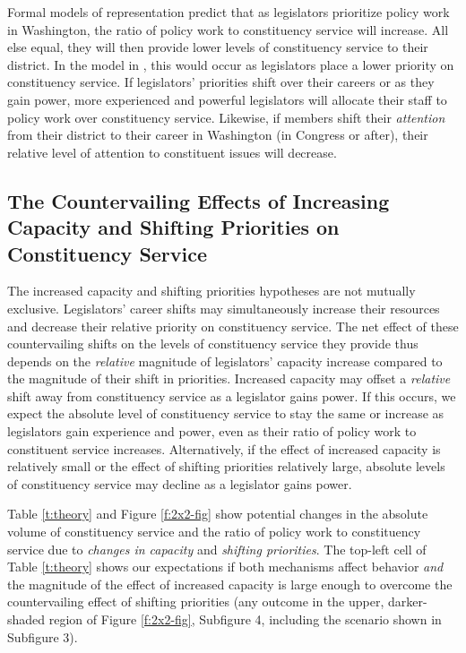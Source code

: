 \documentclass[12pt]{article}
\begin{document}
Formal models of representation predict that as legislators prioritize policy work in Washington, the ratio of policy work to constituency service will increase. All else equal, they will then provide lower levels of constituency service to their district. In the model in \cite{AshworthBuenodeMesquita2006}, this would occur as legislators place a lower priority on constituency service. If legislators' priorities shift over their careers or as they gain power, more experienced and powerful legislators will allocate their staff to policy work over constituency service. Likewise, if members shift their \textit{attention} from their district to their career in Washington (in Congress or after), their relative level of attention to constituent issues will decrease.


\subsection{The Countervailing Effects of Increasing Capacity and Shifting Priorities on Constituency Service}

The increased capacity and shifting priorities hypotheses are not mutually exclusive.
Legislators' career shifts may simultaneously increase their resources and decrease their relative priority on constituency service. The net effect of these countervailing shifts on the levels of constituency service they provide thus depends on the \textit{relative} magnitude of legislators' capacity increase compared to the magnitude of their shift in priorities. Increased capacity may offset a \textit{relative} shift away from constituency service as a legislator gains power. If this occurs, we expect the absolute level of constituency service to stay the same or increase as legislators gain experience and power, even as their ratio of policy work to constituent service increases. Alternatively, if the effect of increased capacity is relatively small or the effect of shifting priorities relatively large, absolute levels of constituency service may decline as a legislator gains power.

Table \ref{t:theory} and Figure \ref{f:2x2-fig} show potential changes in the absolute volume of constituency service and the ratio of policy work to constituency service due to \textit{changes in capacity} and \textit{shifting priorities}. The top-left cell of Table \ref{t:theory} shows our expectations if both mechanisms affect behavior \textit{and} the magnitude of the effect of increased capacity is large enough to overcome the countervailing effect of shifting priorities (any outcome in the upper, darker-shaded region of Figure \ref{f:2x2-fig}, Subfigure 4, including the scenario shown in Subfigure 3).
\end{document}
